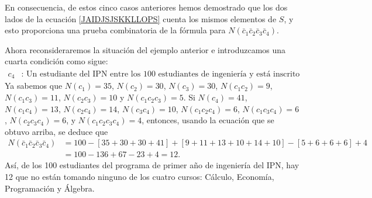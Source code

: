 \begin{myexample}
\begin{enumerate}[label=\arabic*)]
        En consecuencia, de estos cinco casos anteriores hemos demostrado que los dos lados de la ecuación \eqref{JAIDJSJSKKLLOPS} cuenta los mismos elementos de $S$, y esto proporciona una prueba combinatoria de la fórmula para $N(\bar{c}_1 \bar{c}_2 \bar{c}_3 \bar{c} _4)$.
    \end{enumerate}
    Ahora reconsideraremos la situación del ejemplo anterior e introduzcamos una cuarta condición como sigue:
    \begin{align*}
        c_4 &: \text{ Un estudiante del IPN entre los 100 estudiantes de ingeniería y está inscrito en Álgebra.}
    \end{align*}
    Ya sabemos que $N\left(c_1\right)=35$, $N\left(c_2\right)=30$, $N\left(c_3\right)=30$, $N\left(c_1 c_2\right)=9$, $N\left(c_1 c_3\right)=11$, $N\left(c_2 c_3\right)=10$ y $N\left(c_1 c_2 c_3\right)=5$. Si $N\left(c_4\right)=41$, $N\left(c_1 c_4\right)=13$, $N\left(c_2 c_4\right)=14$, $N\left(c_3 c_4\right)=10$, $N\left(c_1 c_2 c_4\right)=6$, $N\left(c_1 c_3 c_4\right)=6$, $N\left(c_2 c_3 c_4\right)=6$, y $N\left(c_1 c_2 c_3 c_4\right)=4$, entonces, usando la ecuación que se obtuvo arriba, se deduce que
    \begin{align*}
        N(\bar{c}_1 \bar{c}_2 \bar{c}_3 \bar{c}_4) & = 100-[35+30+30+41]+[9+11+13+10+14+10]-[5+6+6+6]+4 \\
        & = 100-136+67-23 +4=12.
    \end{align*}
    Así, de los 100 estudiantes del programa de primer año de ingeniería del IPN, hay 12 que no están tomando ninguno de los cuatro cursos: Cálculo, Economía, Programación y Álgebra.


\end{myexample}
